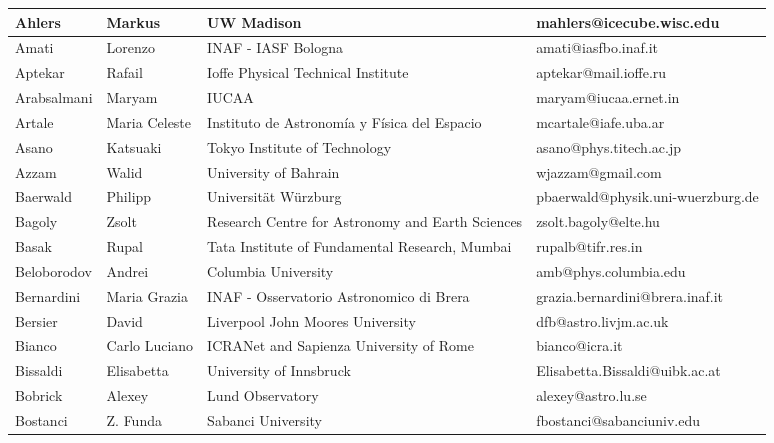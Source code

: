 \begin{center}
  \begin{longtable}{|p{1.28cm} |p{1.28cm} |p{2.9cm} |p{3cm} |}
    \hline
\tiny Ahlers &\tiny Markus & \tiny UW Madison & \tiny mahlers@icecube.wisc.edu \\ \hline
\tiny Amati &\tiny Lorenzo & \tiny INAF - IASF Bologna & \tiny amati@iasfbo.inaf.it \\ \hline
\tiny Aptekar &\tiny Rafail & \tiny Ioffe Physical Technical Institute & \tiny aptekar@mail.ioffe.ru \\ \hline
\tiny Arabsalmani &\tiny Maryam & \tiny IUCAA & \tiny maryam@iucaa.ernet.in \\ \hline
\tiny Artale &\tiny Maria Celeste & \tiny Instituto de Astronom\'ia y F\'isica del Espacio & \tiny mcartale@iafe.uba.ar \\ \hline
\tiny Asano &\tiny Katsuaki & \tiny Tokyo Institute of Technology & \tiny asano@phys.titech.ac.jp \\ \hline
\tiny Azzam &\tiny Walid & \tiny University of Bahrain & \tiny wjazzam@gmail.com \\ \hline
\tiny Baerwald &\tiny Philipp & \tiny Universit\"at W\"urzburg & \tiny pbaerwald@physik.uni-wuerzburg.de \\ \hline
\tiny Bagoly &\tiny Zsolt & \tiny Research Centre for Astronomy and Earth Sciences & \tiny zsolt.bagoly@elte.hu \\ \hline
\tiny Basak &\tiny Rupal & \tiny Tata Institute of Fundamental Research, Mumbai & \tiny rupalb@tifr.res.in \\ \hline
\tiny Beloborodov &\tiny Andrei & \tiny Columbia University & \tiny amb@phys.columbia.edu \\ \hline
\tiny Bernardini &\tiny Maria Grazia & \tiny INAF - Osservatorio Astronomico di Brera & \tiny grazia.bernardini@brera.inaf.it \\ \hline
\tiny Bersier &\tiny David & \tiny Liverpool John Moores University & \tiny dfb@astro.livjm.ac.uk \\ \hline
\tiny Bianco &\tiny Carlo Luciano & \tiny ICRANet and Sapienza University of Rome & \tiny bianco@icra.it \\ \hline
\tiny Bissaldi &\tiny Elisabetta & \tiny University of Innsbruck & \tiny Elisabetta.Bissaldi@uibk.ac.at \\ \hline
\tiny Bobrick &\tiny Alexey & \tiny Lund Observatory & \tiny alexey@astro.lu.se \\ \hline
\tiny Bostanci &\tiny Z. Funda & \tiny Sabanci University & \tiny fbostanci@sabanciuniv.edu \\ \hline

\end{longtable}
\end{center}
